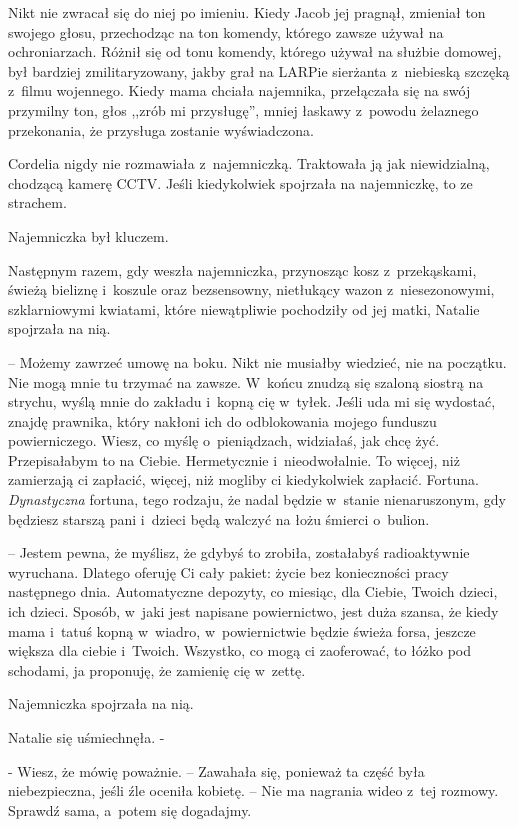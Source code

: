 \documentclass[oneside,polish,11pt,sfheadings]{mwbk}
\begin{document}
Nikt nie zwracał się do niej po imieniu. Kiedy Jacob jej pragnął,
zmieniał ton swojego głosu, przechodząc na ton komendy, którego zawsze
używał na ochroniarzach. Różnił się od tonu komendy, którego używał na
służbie domowej, był bardziej zmilitaryzowany, jakby grał na LARPie
sierżanta z~niebieską szczęką z~filmu wojennego. Kiedy mama chciała
najemnika, przełączała się na swój przymilny ton, głos ,,zrób mi
przysługę'', mniej łaskawy z~powodu żelaznego przekonania, że przysługa
zostanie wyświadczona.

Cordelia nigdy nie rozmawiała z~najemniczką. Traktowała ją jak
niewidzialną, chodzącą kamerę CCTV. Jeśli kiedykolwiek spojrzała na
najemniczkę, to ze strachem.

Najemniczka był kluczem.

Następnym razem, gdy weszła najemniczka, przynosząc kosz z~przekąskami,
świeżą bieliznę i~koszule oraz bezsensowny, nietłukący wazon z~niesezonowymi, szklarniowymi kwiatami, które niewątpliwie pochodziły od
jej matki, Natalie spojrzała na nią.

-- Możemy zawrzeć umowę na boku. Nikt nie musiałby wiedzieć, nie na
początku. Nie mogą mnie tu trzymać na zawsze. W~końcu znudzą się szaloną
siostrą na strychu, wyślą mnie do zakładu i~kopną cię w~tyłek. Jeśli uda
mi się wydostać, znajdę prawnika, który nakłoni ich do odblokowania
mojego funduszu powierniczego. Wiesz, co myślę o~pieniądzach, widziałaś,
jak chcę żyć. Przepisałabym to na Ciebie. Hermetycznie i~nieodwołalnie.
To więcej, niż zamierzają ci zapłacić, więcej, niż mogliby ci
kiedykolwiek zapłacić. Fortuna. \textit{Dynastyczna} fortuna, tego
rodzaju, że nadal będzie w~stanie nienaruszonym, gdy będziesz starszą
pani i~dzieci będą walczyć na łożu śmierci o~bulion.

-- Jestem pewna, że myślisz, że gdybyś to zrobiła, zostałabyś
radioaktywnie wyruchana. Dlatego oferuję Ci cały pakiet: życie bez
konieczności pracy następnego dnia. Automatyczne depozyty, co miesiąc,
dla Ciebie, Twoich dzieci, ich dzieci. Sposób, w~jaki jest napisane
powiernictwo, jest duża szansa, że kiedy mama i~tatuś kopną w~wiadro, w~powiernictwie będzie świeża forsa, jeszcze większa dla ciebie i~Twoich.
Wszystko, co mogą ci zaoferować, to łóżko pod schodami, ja proponuję, że
zamienię cię w~zettę.

Najemniczka spojrzała na nią.

Natalie się uśmiechnęła. -

- Wiesz, że mówię poważnie. -- Zawahała się,
ponieważ ta część była niebezpieczna, jeśli źle oceniła kobietę. -- Nie
ma nagrania wideo z~tej rozmowy. Sprawdź sama, a~potem się dogadajmy.
\end{document}
